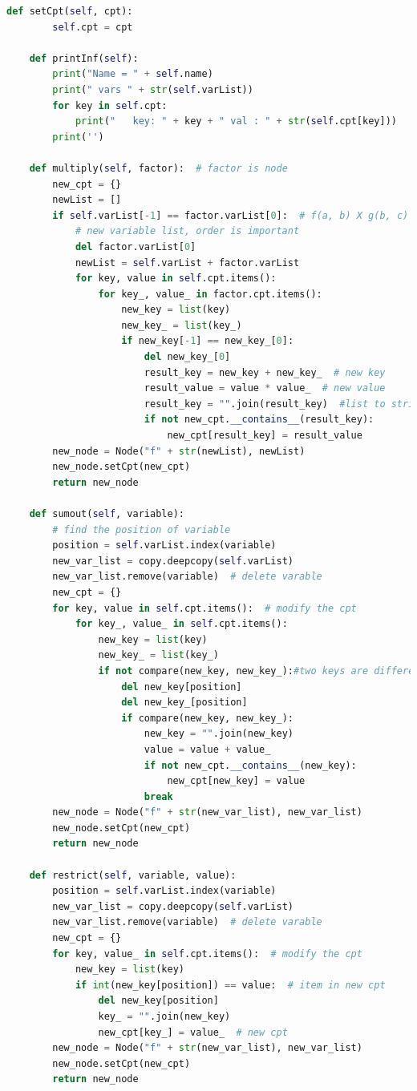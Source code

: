 ﻿\documentclass[a4paper, 11pt]{article}
\begin{document}
\begin{lstlisting}[language=Python,frame=single]
    def setCpt(self, cpt):
        self.cpt = cpt

    def printInf(self):
        print("Name = " + self.name)
        print(" vars " + str(self.varList))
        for key in self.cpt:
            print("   key: " + key + " val : " + str(self.cpt[key]))
        print('')

    def multiply(self, factor):  # factor is node
        new_cpt = {}
        newList = []
        if self.varList[-1] == factor.varList[0]:  # f(a, b) X g(b, c)
            # new variable list, order is important
            del factor.varList[0]
            newList = self.varList + factor.varList
            for key, value in self.cpt.items():
                for key_, value_ in factor.cpt.items():
                    new_key = list(key)
                    new_key_ = list(key_)
                    if new_key[-1] == new_key_[0]:
                        del new_key_[0]
                        result_key = new_key + new_key_  # new key
                        result_value = value * value_  # new value
                        result_key = "".join(result_key)  #list to string
                        if not new_cpt.__contains__(result_key):
                            new_cpt[result_key] = result_value
        new_node = Node("f" + str(newList), newList)
        new_node.setCpt(new_cpt)
        return new_node

    def sumout(self, variable):
        # find the position of variable
        position = self.varList.index(variable)
        new_var_list = copy.deepcopy(self.varList)
        new_var_list.remove(variable)  # delete varable
        new_cpt = {}
        for key, value in self.cpt.items():  # modify the cpt
            for key_, value_ in self.cpt.items():
                new_key = list(key)
                new_key_ = list(key_)
                if not compare(new_key, new_key_):#two keys are different
                    del new_key[position]
                    del new_key_[position]
                    if compare(new_key, new_key_):
                        new_key = "".join(new_key)
                        value = value + value_
                        if not new_cpt.__contains__(new_key):
                            new_cpt[new_key] = value
                        break
        new_node = Node("f" + str(new_var_list), new_var_list)
        new_node.setCpt(new_cpt)
        return new_node

    def restrict(self, variable, value):
        position = self.varList.index(variable)
        new_var_list = copy.deepcopy(self.varList)
        new_var_list.remove(variable)  # delete varable
        new_cpt = {}
        for key, value_ in self.cpt.items():  # modify the cpt
            new_key = list(key)
            if int(new_key[position]) == value:  # item in new cpt
                del new_key[position]
                key_ = "".join(new_key)
                new_cpt[key_] = value_  # new cpt
        new_node = Node("f" + str(new_var_list), new_var_list)
        new_node.setCpt(new_cpt)
        return new_node


\end{lstlisting}
\end{document}
